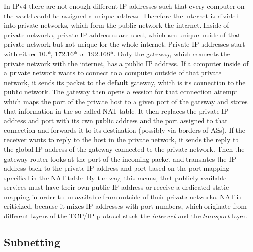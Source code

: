 In \ac{IP}v4 there are not enough different IP addresses such that every computer on the world could be assigned a unique address. Therefore the internet is divided into private networks, which form the public network \textendash{} the internet. Inside of private networks, private IP addresses are used, which are unique inside of that private network but not unique for the whole internet. Private IP addresses start with either 10.*, 172.16* or 192.168*. Only the gateway, which connects the private network with the internet, has a public IP address. If a computer inside of a private network wants to connect to a computer outside of that private network, it sends its packet to the default gateway, which is its connection to the public network. The gateway then opens a session for that connection attempt which maps the port of the private host to a given port of the gateway and stores that information in the so called \ac{NAT}-table. It then replaces the private IP address and port with its own public address and the port assigned to that connection and forwards it to its destination (possibly via borders of \acl{AS}s). If the receiver wants to reply to the host in the private network, it sends the reply to the global IP address of the gateway connected to the private network. Then the gateway router looks at the port of the incoming packet and translates the IP address back to the private IP address and port based on the port mapping specified in the \ac{NAT}-table. By the way, this means, that publicly available services must have their own public IP address or receive a dedicated static mapping in order to be available from outside of their private networks. \ac{NAT} is criticized, because it mixes IP addresses with port numbers, which originate from different layers of the \ac{TCP}/\ac{IP} protocol stack \textendash{} the \textit{internet} and the \textit{transport} layer.

\subsection{Subnetting}

